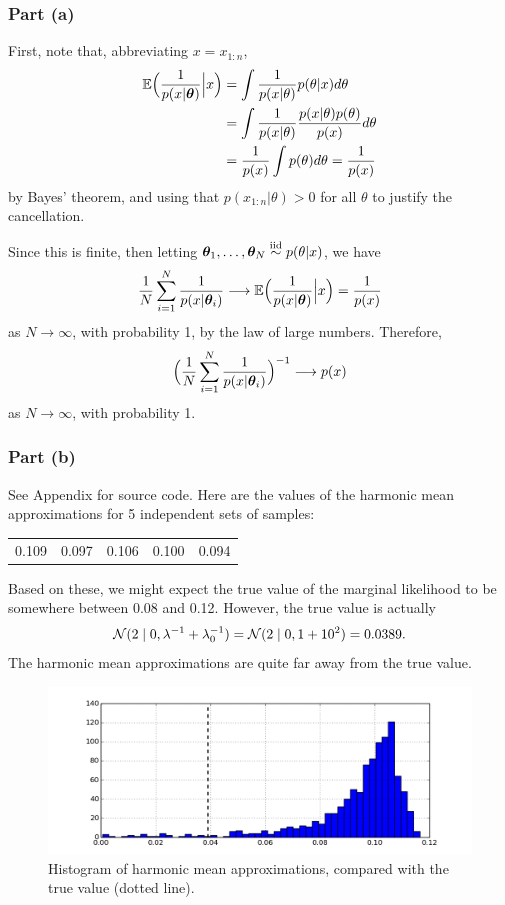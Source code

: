 \documentclass[12pt]{article}
\begin{document}
\subsubsection*{Part (a)}
First, note that, abbreviating $x = x_{1:n}$,
\begin{align*}
\mathbb{E}\Big(\frac{1}{p(x|{\bm\theta})}\Big\vert x\Big) 
& = \int \frac{1}{p(x|\theta)} p(\theta|x)d\theta\\
& = \int \frac{1}{p(x|\theta)} \frac{p(x|\theta) p(\theta)}{p(x)}d\theta\\
& = \frac{1}{p(x)}\int p(\theta) d\theta =\frac{1}{p(x)}
\end{align*}
by Bayes' theorem, and using that $p(x_{1:n}|\theta)>0$ for all $\theta$ to justify the cancellation.

Since this is finite, then letting ${\bm\theta}_1,\dotsc,{\bm\theta}_N\stackrel{\mathrm{iid}}{\sim} p(\theta|x)$, we have
$$\frac{1}{N}\sum_{i = 1}^N \frac{1}{p(x|{\bm\theta}_i)}\longrightarrow \mathbb{E}\Big(\frac{1}{p(x|{\bm\theta})}\Big\vert x\Big)=\frac{1}{p(x)}$$
as $N\to\infty$, with probability 1, by the law of large numbers. Therefore,
$$\Big(\frac{1}{N}\sum_{i = 1}^N \frac{1}{p(x|{\bm\theta}_i)}\Big)^{-1}\longrightarrow p(x)$$
as $N\to\infty$, with probability 1.

\subsubsection*{Part (b)}
See Appendix for source code. 
Here are the values of the harmonic mean approximations for 5 independent sets of samples:
\begin{center}
\begin{tabular}{ccccc}
0.109 &
0.097 &
0.106 &
0.100 &
0.094 
\end{tabular}
\end{center}
Based on these, we might expect the true value of the marginal likelihood to be somewhere between 0.08 and 0.12.
However, the true value is actually
$$\mathcal{N}(2\mid 0,\lambda^{-1}+\lambda_0^{-1}) = \mathcal{N}(2\mid 0, 1 + 10^2) = 0.0389.$$
The harmonic mean approximations are quite far away from the true value.

\begin{figure}
  \begin{center}
    \includegraphics[width=1\textwidth]{harmonic.png}
  \end{center}
  \caption{Histogram of harmonic mean approximations, compared with the true value (dotted line).}
  \label{figure:harmonic}
\end{figure}
\end{document}

